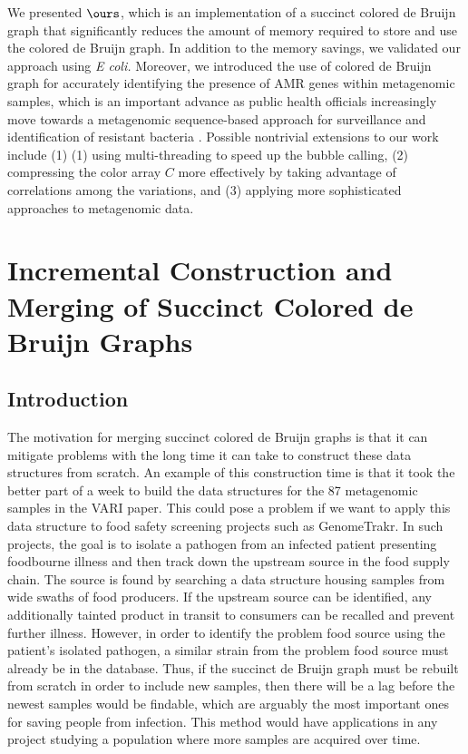\documentclass[doctor]{thesis}
\begin{document}
We presented $\ours$, which is an implementation of a succinct colored de Bruijn graph that significantly reduces the amount of memory required to store and use the colored de Bruijn graph. In addition to the memory savings, we validated our approach using {\em E coli.} Moreover, we introduced the use of colored de Bruijn graph for accurately identifying the presence of AMR genes within metagenomic samples, which is an important advance as public health officials increasingly move towards a metagenomic sequence-based approach for surveillance and identification of resistant bacteria \cite{baquero_metagenomic_epi, port_2014_metagenomics_AMR_monitoring,FAOActionPlan2016}. Possible nontrivial extensions to our work include (1)
(1) using multi-threading to speed up the bubble calling, (2) compressing the color array $C$ more effectively by taking advantage of correlations among the variations, and (3) applying more sophisticated approaches to metagenomic data.





 

\chapter{Incremental Construction and Merging of Succinct Colored de Bruijn Graphs}

\makeatletter{}\section{Introduction}

The motivation for merging succinct colored de Bruijn graphs is that it can mitigate problems with the long time it can take to construct these data structures from scratch.  An example of this construction time is that it took the better part of a week to build the data structures for the 87 metagenomic samples in the VARI paper.  This could pose a problem if we want to apply this data structure to food safety screening projects such as GenomeTrakr.  In such projects, the goal is to isolate a pathogen from an infected patient presenting foodbourne illness and then track down the upstream source in the food supply chain.  The source is found by searching a data structure housing samples from wide swaths of food producers.  If the upstream source can be identified, any additionally tainted product in transit to consumers can be recalled and prevent further illness.  However, in order to identify the problem food source using the patient's isolated pathogen, a similar strain from the problem food source must already be in the database.  Thus, if the succinct de Bruijn graph must be rebuilt from scratch in order to include new samples, then there will be a lag before the newest samples would be findable, which are arguably the most important ones for saving people from infection.  This method would have applications in any project studying a population where more samples are acquired over time.
\end{document}
